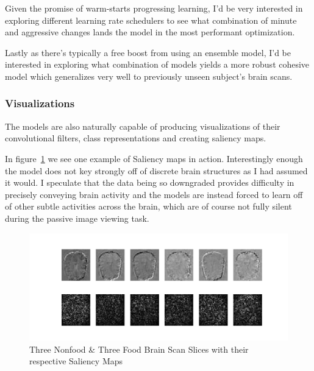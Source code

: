 Given the promise of warm-starts progressing learning, I'd be very interested in exploring different
learning rate schedulers to see what combination of minute and aggressive changes lands the model in the most performant
optimization.

Lastly as there's typically a free boost from using an ensemble model, I'd be interested in exploring what combination
of models yields a more robust cohesive model which generalizes very well to previously unseen subject's brain scans.

\subsubsection{Visualizations}\label{fw-viz}

The models are also naturally capable of producing visualizations of their convolutional filters, class representations
and creating saliency maps.

In figure~\ref{fig:saliency} we see one example of Saliency maps in action.
Interestingly enough the model does not key strongly off of discrete brain structures as I had assumed it would.
I speculate that the data being so downgraded provides difficulty in precisely conveying brain activity and the models
are instead forced to learn off of other subtle activities across the brain, which are of course not fully silent during
the passive image viewing task.

 \begin{figure}
  \includegraphics[width=\linewidth]{images/saliency.png}
  \caption{Three Nonfood \& Three Food Brain Scan Slices with their respective Saliency Maps}
  \label{fig:saliency}
\end{figure}



